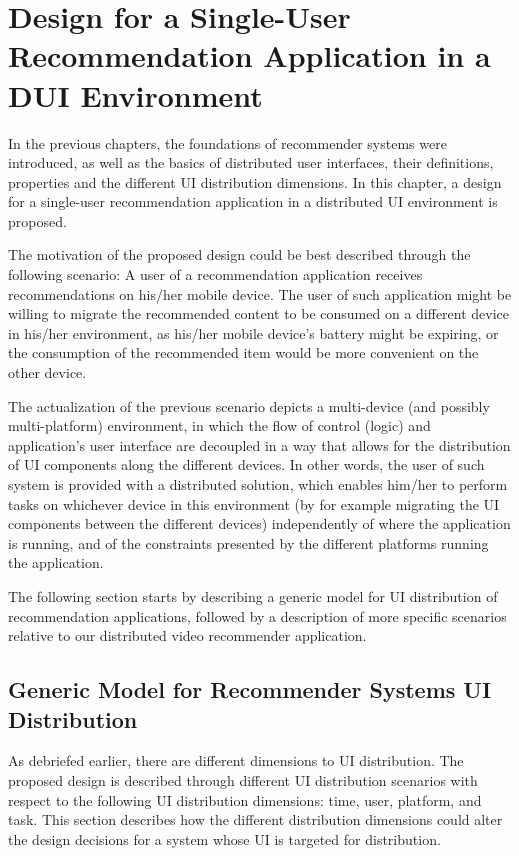 \chapter{Design for a Single-User Recommendation Application in a DUI Environment}\label{chapter:design}

In the previous chapters, the foundations of recommender systems were introduced, as well as the basics of distributed user interfaces, their definitions, properties and the different UI distribution dimensions. In this chapter, a design for a single-user recommendation application in a distributed UI environment is proposed.

The motivation of the proposed design could be best described through the following scenario: A user of a recommendation application receives recommendations on his/her mobile device. The user of such application might be willing to migrate the recommended content to be consumed on a different device in his/her environment, as his/her mobile device's battery might be expiring, or the consumption of the recommended item would be more convenient on the other device.

The actualization of the previous scenario depicts a multi-device (and possibly multi-platform) environment, in which the flow of control (logic) and application's user interface are decoupled in a way that allows for the distribution of UI components along the different devices. In other words, the user of such system is provided with a distributed solution, which enables him/her to perform tasks on whichever device in this environment (by for example migrating the UI components between the different devices) independently of where the application is running, and of the constraints presented by the different platforms running the application.

The following section starts by describing a generic model for UI distribution of recommendation applications, followed by a description of more specific scenarios relative to our distributed video recommender application.


\section{Generic Model for Recommender Systems UI Distribution}
As debriefed earlier, there are different dimensions to UI distribution. The proposed design is described through different UI distribution scenarios with respect to the following UI distribution dimensions: time, user, platform, and task. This section describes how the different distribution dimensions could alter the design decisions for a system whose UI is targeted for distribution. 
